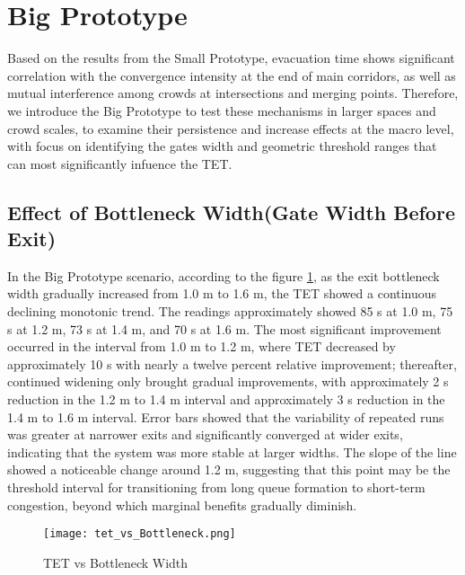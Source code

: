 \section{Big Prototype}

Based on the results from the Small Prototype, evacuation time shows significant correlation with the convergence intensity at the end of main corridors, as well as mutual interference among crowds at intersections and merging points. Therefore, we introduce the Big Prototype to test these mechanisms in larger spaces and crowd scales, to examine their persistence and increase effects at the macro level, with focus on identifying the gates width and geometric threshold ranges that can most significantly infuence the TET.

\subsection{Effect of Bottleneck Width(Gate Width Before Exit)}

In the Big Prototype scenario, according to the figure \ref{fig:tet_vs_Bottleneck}, as the exit bottleneck width gradually increased from 1.0 m to 1.6 m, the TET showed a continuous declining monotonic trend. The readings approximately showed 85 s at 1.0 m, 75 s at 1.2 m, 73 s at 1.4 m, and 70 s at 1.6 m. The most significant improvement occurred in the interval from 1.0 m to 1.2 m, where TET decreased by approximately 10 s with nearly a twelve percent relative improvement; thereafter, continued widening only brought gradual improvements, with approximately 2 s reduction in the 1.2 m to 1.4 m interval and approximately 3 s reduction in the 1.4 m to 1.6 m interval. Error bars showed that the variability of repeated runs was greater at narrower exits and significantly converged at wider exits, indicating that the system was more stable at larger widths. The slope of the line showed a noticeable change around 1.2 m, suggesting that this point may be the threshold interval for transitioning from long queue formation to short-term congestion, beyond which marginal benefits gradually diminish.

\begin{figure}[h]
    \centering
    \texttt{[image: tet\_vs\_Bottleneck.png]}
    \caption{TET vs Bottleneck Width}
    \label{fig:tet_vs_Bottleneck}
\end{figure}

